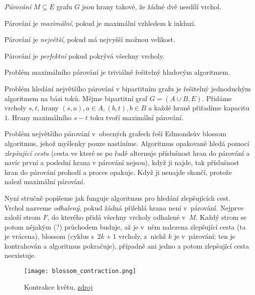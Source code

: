 \begin{definition}
    {\em Párování} $M \subseteq E$ grafu $G$ jsou hrany takové, že
    žádné dvě nesdílí vrchol.

    Párování je {\em maximální}, pokud je maximální vzhledem k inkluzi.

    Párování je {\em největší}, pokud má nejvyšší možnou velikost.

    Párování je {\em perfektní} pokud pokrývá všechny vrcholy.
\end{definition}

Problém maximálního párování je triviálně řešitelný hladovým
algoritmem.

Problém hledání největšího párování v bipartitním grafu je řešitelný
jednoduchým algoritmem na bázi toků. Mějme bipartitní graf
$G = (A \cup B, E)$. Přidáme vrcholy $s, t$,
hrany $(s, a), a \in A, (b, t), b \in B$ a každé hraně přiřadíme
kapacitu $1$. Hrany maximálního $s-t$ toku tvoří maximální párování.


Problém největšího párování v~obecných grafech řeší Edmondsův blossom
algoritmus, jehož myšlenky pouze nastíníme.
Algoritmus opakovaně hledá pomocí {\em zlepšující
cestu} (cesta ve které
se po řadě alternuje příslušnost hran do párování a navíc první a
poslední hrana v párování nejsou), když ji najde, tak příslušnost hran do
párování prohodí a proces opakuje. Když ji nenajde skončí, protože
nalezl maximální párování.

Nyní stručně popíšeme jak funguje algoritmus pro hledání zlepšujících
cest. Vrchol nazveme {\em odhalený}, pokud žádná přilehlá hrana není v~párování.
Nejprve založí strom $F$, do kterého přidá všechny vrcholy odhalené
v~$M$. Každý strom se potom nějakým (?) průchodem buduje, až je v~něm nalezena zlepšující
cesta (ta je vrácena), blossom (cyklus s~$2k+1$ vrcholy, z~nichž $k$ je
v~párování; ten je kontrahován a algoritmus pokračuje), případně ani
jedno a potom zlepšující cesta neexistuje.

\begin{figure}[H]
    \centering
    \texttt{[image: blossom\_contraction.png]}
    \caption{Kontrakce květu, \href{https://en.wikipedia.org/wiki/Blossom_algorithm}{zdroj}}
\end{figure}

